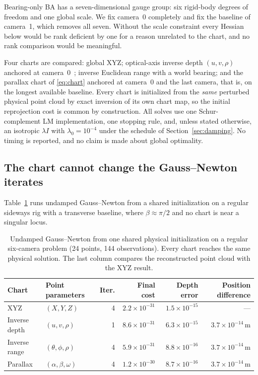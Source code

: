\documentclass[11pt,a4paper]{article}
\let\cite\citep
\theoremstyle{definition}
\theoremstyle{remark}
\begin{document}
Bearing-only BA has a seven-dimensional gauge group: six rigid-body degrees of freedom and one global scale. We fix camera~0 completely and fix the baseline of camera~1, which removes all seven. Without the scale constraint every Hessian below would be rank deficient by one for a reason unrelated to the chart, and no rank comparison would be meaningful.

Four charts are compared: global XYZ; optical-axis inverse depth $(u,v,\rho)$ anchored at camera~0~\cite{civera2008inverse}; inverse Euclidean range with a world bearing; and the parallax chart of \eqref{eq:chart} anchored at camera~0 and the last camera, that is, on the longest available baseline. Every chart is initialized from the \emph{same} perturbed physical point cloud by exact inversion of its own chart map, so the initial reprojection cost is common by construction. All solves use one Schur-complement LM implementation, one stopping rule, and, unless stated otherwise, an isotropic $\lambda I$ with $\lambda_0=10^{-4}$ under the schedule of Section~\ref{sec:damping}. No timing is reported, and no claim is made about global optimality.

\subsection{The chart cannot change the Gauss--Newton iterates}
Table~\ref{tab:gn-invariance} runs undamped Gauss--Newton from a shared initialization on a regular sideways rig with a transverse baseline, where $\beta\approx\pi/2$ and no chart is near a singular locus.

\begin{table}[t]
\centering
\caption{Undamped Gauss--Newton from one shared physical initialization on a regular six-camera problem (24 points, 144 observations). Every chart reaches the same physical solution. The last column compares the reconstructed point cloud with the XYZ result.}
\label{tab:gn-invariance}
\small
\setlength{\tabcolsep}{4.2pt}
\begin{tabular}{llrrrr}
\toprule
Chart & Point parameters & Iter. & Final cost & Depth error & Position difference\\
\midrule
XYZ & $(X,Y,Z)$ & 4 & $2.2\times10^{-31}$ & $1.5\times10^{-15}$ & ---\\
Inverse depth & $(u,v,\rho)$ & 1 & $8.6\times10^{-31}$ & $6.3\times10^{-15}$ & $3.7\times10^{-14}$\,m\\
Inverse range & $(\theta,\phi,\rho)$ & 4 & $5.9\times10^{-31}$ & $8.8\times10^{-16}$ & $3.7\times10^{-14}$\,m\\
Parallax & $(\alpha,\beta,\omega)$ & 4 & $1.2\times10^{-30}$ & $8.7\times10^{-16}$ & $3.7\times10^{-14}$\,m\\
\bottomrule
\end{tabular}
\end{table}
\end{document}
